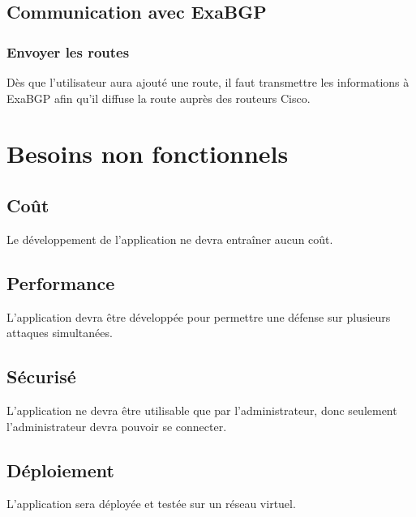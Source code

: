 \subsection{Communication avec ExaBGP}

\subsubsection{Envoyer les routes}
Dès que l'utilisateur aura ajouté une route, il faut transmettre les informations à ExaBGP afin qu'il diffuse la route auprès des routeurs Cisco.
\newpage




\section{Besoins non fonctionnels}

\subsection{Coût}
Le développement de l'application ne devra entraîner aucun coût.

\subsection{Performance}
L'application devra être développée pour permettre une défense sur plusieurs attaques simultanées.

\subsection{Sécurisé}
L’application ne devra être utilisable que par l'administrateur, donc seulement l'administrateur devra pouvoir se connecter.

\subsection{Déploiement}
L'application sera déployée et testée sur un réseau virtuel.

